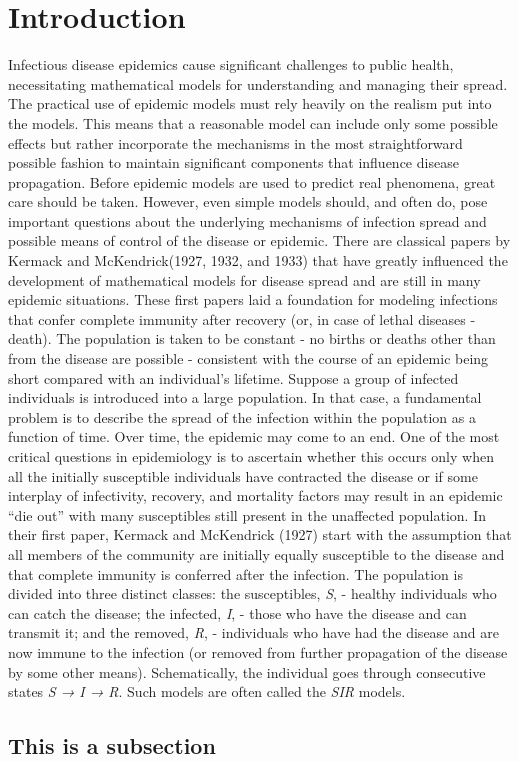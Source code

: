 \section{Introduction}\label{Introduction}\thispagestyle{SectionFirstPage} %
\hspace{\parindent} Infectious disease epidemics cause significant challenges to public health, necessitating mathematical models for understanding and managing their spread.
The practical use of epidemic models must rely heavily on the realism put into the models.
This means that a reasonable model can include only some possible effects but rather incorporate the mechanisms in the most straightforward possible fashion to maintain significant components that influence disease propagation.
Before epidemic models are used to predict real phenomena, great care should be taken.
However, even simple models should, and often do, pose important questions about the underlying mechanisms of infection spread and possible means of control of the disease or epidemic.
There are classical papers by Kermack and McKendrick(1927, 1932, and 1933) that have greatly influenced the development of mathematical models for disease spread and are still in many epidemic situations.
These first papers laid a foundation for modeling infections that confer complete immunity after recovery (or, in case of lethal diseases - death).
The population is taken to be constant - no births or deaths other than from the disease are possible - consistent with the course of an epidemic being short compared with an individual's lifetime.
Suppose a group of infected individuals is introduced into a large population. In that case, a fundamental problem is to describe the spread of the infection within the population as a function of time.
Over time, the epidemic may come to an end.
One of the most critical questions in epidemiology is to ascertain whether this occurs only when all the initially susceptible individuals have contracted the disease or if some interplay of infectivity, recovery, and mortality factors may result in an epidemic “die out” with many susceptibles still present in the unaffected population.
In their first paper, Kermack and McKendrick (1927) start with the assumption that all members of the community are initially equally susceptible to the disease and that complete immunity is conferred after the infection.
The population is divided into three distinct classes: the susceptibles, \textit{S}, - healthy individuals who can catch the disease; the infected, \textit{I}, - those who have the disease and can transmit it; and the removed, \textit{R}, - individuals who have had the disease and are now immune to the infection (or removed from further propagation of the disease by some other means).
Schematically, the individual goes through consecutive states \textit{S → I → R}.
Such models are often called the \textit{SIR} models.

\subsection{This is a subsection}
